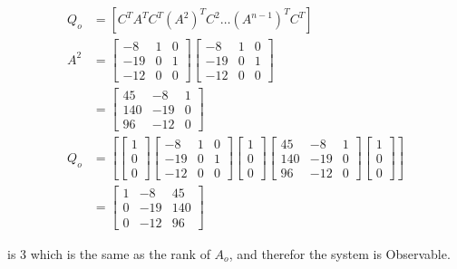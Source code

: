 \documentclass[main.tex]{subfiles}
\begin{document}
\begin{enumerate}
\begin{enumerate}
        $$
        \begin{aligned}
        Q_o &= \left[C^T A^T C^T\left(A^2\right)^T C^2 \ldots\left(A^{n-1}\right)^T C^T\right]\\
        A^2 &= \left[\begin{array}{lll}
        -8 & 1 & 0 \\
        -19 & 0 & 1 \\
        -12 & 0 & 0
        \end{array}\right] \left[\begin{array}{lll}
        -8 & 1 & 0 \\
        -19 & 0 & 1 \\
        -12 & 0 & 0
        \end{array}\right]\\
        & = \left[\begin{array}{ccc}
        45 & -8 & 1 \\
        140 & -19 & 0 \\
        96 & -12 & 0
        \end{array}\right] \\
        Q_o &= \left[ \left[\begin{array}{l}
        1 \\
        0 \\
        0
        \end{array}\right] \left[\begin{array}{lll}
        -8 & 1 & 0 \\
        -19 & 0 & 1 \\
        -12 & 0 & 0
        \end{array}\right] \left[\begin{array}{l}
        1 \\
        0 \\
        0
        \end{array}\right] \left[\begin{array}{ccc}
        45 & -8 & 1 \\
        140 & -19 & 0 \\
        96 & -12 & 0
        \end{array}\right] \left[\begin{array}{l}
        1 \\
        0 \\
        0
        \end{array}\right] \right] \\
        & = \left[\begin{array}{lll}
        1 & -8 & 45\\
        0 & -19 & 140 \\
        0 & -12 & 96
        \end{array} \right]
        \end{aligned}
        $$
        
        is 3 which is the same as the rank of $A_o$, and therefor the system is Observable.
        
    \end{enumerate}

\end{enumerate}
\end{document}
